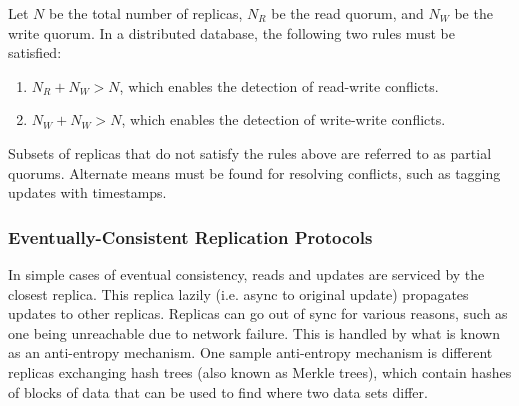 \documentclass[12pt,titlepage]{article}
\begin{document}
        Let $N$ be the total number of replicas, $N_R$ be the read quorum, and $N_W$ be the write quorum. In a distributed database, the following two rules must
        be satisfied:
        \begin{enumerate}
          \item $N_R + N_W > N$, which enables the detection of read-write conflicts.
          \item $N_W + N_W > N$, which enables the detection of write-write conflicts.
        \end{enumerate}

        Subsets of replicas that do not satisfy the rules above are referred to as partial quorums. Alternate means must be found for resolving conflicts, such
        as tagging updates with timestamps.

      \subsubsection{Eventually-Consistent Replication Protocols}
        In simple cases of eventual consistency, reads and updates are serviced by the closest replica. This replica lazily (i.e. async to original update) propagates
        updates to other replicas. Replicas can go out of sync for various reasons, such as one being unreachable due to network failure. This is handled by what is
        known as an anti-entropy mechanism. One sample anti-entropy mechanism is different replicas exchanging hash trees (also known as Merkle trees), which contain
        hashes of blocks of data that can be used to find where two data sets differ.
\end{document}
